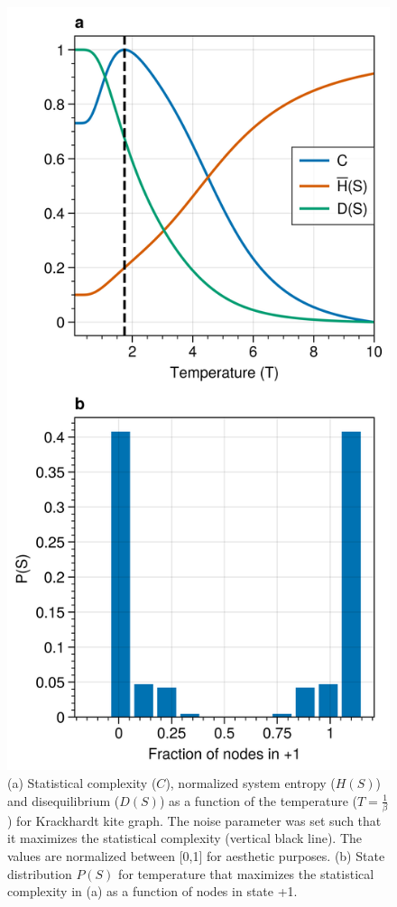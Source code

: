 \documentclass[a4paper, 11pt, twocolumn]{article}
\begin{document}
\begin{figure}[htbp]
\centering
\includegraphics[width=.9\linewidth]{./figures/exact_kite_dyn=ising_beta=0.5732374683235916_T=200_statistical_complexity.png}
\caption{\label{fig:stat_compl}(a) Statistical complexity ($C$), normalized system entropy ($H(S)$) and disequilibrium ($D(S)$) as a function of the temperature ($T = \frac{1}{\beta}$) for Krackhardt kite graph. The noise parameter was set such that it maximizes the statistical complexity (vertical black line). The values are normalized between [0,1] for aesthetic purposes. (b) State distribution $P(S)$ for temperature that maximizes the statistical complexity in (a) as a function of nodes in state +1.}
\end{figure}
\end{document}
